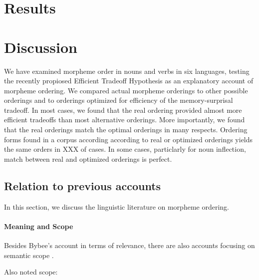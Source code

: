 \documentclass[11pt,letterpaper]{article}
\begin{document}

\section{Results}

\section{Discussion}

We have examined morpheme order in nouns and verbs in six languages, testing the recently propiosed Efficient Tradeoff Hypothesis \citep{hahn2020modeling} as an explanatory account of morpheme ordering.
We compared actual morpheme orderings to other possible orderings and to orderings optimized for efficiency of the memory-surprisal tradeoff.
In most cases, we found that the real ordering provided almost more efficient tradeoffs than most alternative orderings.
More importantly, we found that the real orderings match the optimal orderings in many respects.
Ordering forms found in a corpus according according to real or optimized orderings yields the same orders in XXX of cases.
In some cases, particlarly for noun inflection, match between real and optimized orderings is perfect.

\subsection{Relation to previous accounts}


In this section, we discuss the linguistic literature on morpheme ordering.

\paragraph{Meaning and Scope}


Besides Bybee's account in terms of relevance, there are also accounts focusing on semantic scope \citep{rice2000morpheme}.

Also noted scope: \citep{baker1988incorporation,foley1984functional,chierchia1990meaning,valin1992a}
\end{document}
